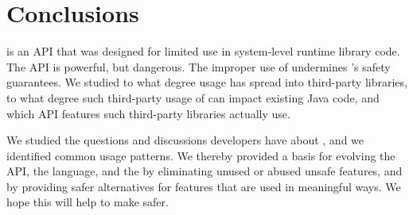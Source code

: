 \section{Conclusions}\label{sec:unsafe:conclusions}

\smu{} is an API that was designed for limited use in system-level runtime library code.
The \unsafe{} API is powerful, but dangerous.
The improper use of \unsafe{} undermines \java{}'s safety guarantees.
We studied to what degree \unsafe{} usage has spread into third-party libraries,
to what degree such third-party usage of \unsafe{} can impact existing Java code,
and which \unsafe{} API features such third-party libraries actually use.

We studied the questions and discussions developers have about \unsafe{},
and we identified common usage patterns.
We thereby provided a basis for evolving the \unsafe{} API, the \java{} language, and the \jvm{}
by eliminating unused or abused unsafe features,
and by providing safer alternatives for features that are used in meaningful ways.
We hope this will help to make \unsafe{} safer.
